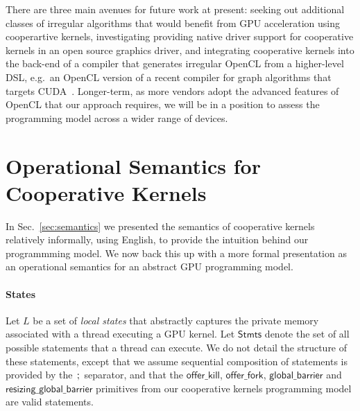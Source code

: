 \documentclass[numbers,nocopyrightspace,10pt]{sigplanconf}
\newcommand{\mysec}{Sec.~}
\newcommand{\code}[1]{\lstset{basicstyle=\tt}\lstinline!#1!\lstset{basicstyle=\scriptsize\tt}}
\newcommand{\offerfork}{\mathsf{offer\_fork}}
\newcommand{\offerkill}{\mathsf{offer\_kill}}
\newcommand{\globalbarrier}{\mathsf{global\_barrier}}
\newcommand{\resizingglobalbarrier}{\mathsf{resizing\_global\_barrier}}
\begin{document}
There are three main avenues for future work at present: seeking out
additional classes of irregular algorithms that would benefit from GPU
acceleration using cooperartive kernels, investigating providing
native driver support for cooperative kernels in an open source
graphics driver, and integrating cooperative kernels into the back-end
of a compiler that generates irregular OpenCL from a higher-level DSL,
e.g.\ an OpenCL version of a recent compiler for graph algorithms that
targets CUDA~\cite{DBLP:conf/oopsla/PaiP16}.  Longer-term, as more
vendors adopt the advanced features of OpenCL that our approach
requires, we will be in a position to assess the programming model
across a wider range of devices.

\clearpage




\clearpage

\appendix

\section{Operational Semantics for Cooperative Kernels}\label{appendix:semantics}

\newcommand{\myss}{\mathit{ss}}
\newcommand{\Stmts}{\mathsf{Stmts}}
\newcommand{\threadstates}{\mathsf{ThreadStates}}
\newcommand{\sharedstates}{\mathsf{SharedStates}}
\newcommand{\sync}{\mathsf{sync}}

In \mysec\ref{sec:semantics} we presented the semantics of cooperative
kernels relatively informally, using English, to provide the intuition
behind our programmming model.  We now back this up with a more formal
presentation as an operational semantics for an abstract GPU
programming model.

\paragraph{States}

Let $L$ be a set of \emph{local states} that abstractly captures the
private memory associated with a thread executing a GPU kernel.  Let
$\Stmts$ denote the set of all possible statements that a
thread can execute.  We do not detail the structure of these
statements, except that we assume sequential composition of statements
is provided by the $\code{;}$ separator, and that the $\offerkill$,
$\offerfork$, $\globalbarrier$ and $\resizingglobalbarrier$ primitives
from our cooperative kernels programming model are valid statements.
\end{document}
